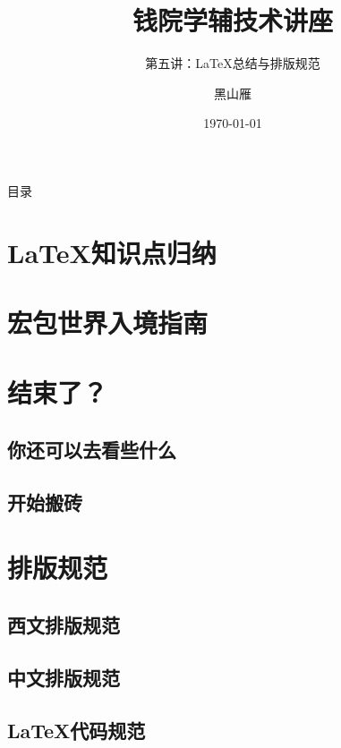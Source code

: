\documentclass{beamer}
\title[Tech Lec]{钱院学辅技术讲座}
\subtitle{第五讲：\LaTeX 总结与排版规范}
\author[xjtu-blacksmith]{黑山雁}
\institute[Xi'an Jiaotong University]
{
  西安交通大学
}
\date{\today}
\begin{document}
\begin{frame}
\maketitle
\end{frame}

\begin{frame}{目录}
    \tableofcontents
\end{frame}

\section{\LaTeX 知识点归纳}

\section{宏包世界入境指南}

\section{结束了？}
\subsection{你还可以去看些什么}
\subsection{开始搬砖}

\section{排版规范}
\subsection{西文排版规范}
\subsection{中文排版规范}
\subsection{\LaTeX 代码规范}
\end{document}

